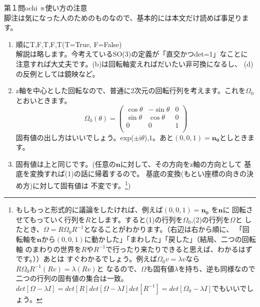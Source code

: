 \begin{answer}{第１問}{ochi}
※使い方の注意\\
脚注は気になった人のためのものなので、基本的には本文だけ読めば事足ります。
\begin{enumerate}
\item
  順にT,F,T,F,T(T=True, F=False)\\

  解説は略します。今考えているSO(3)の定義が「直交かつdet=1」なことに
  注意すれば大丈夫です。(b)は回転軸変えればだいたい非可換になるし、
  (d)の反例としては鏡映など。\\

\item
  z軸を中心とした回転なので、普通に2次元の回転行列を考えます。これを$\Omega_0$とおいときます。
  \begin{equation}
  \Omega_0(\theta)=
  \begin{pmatrix}
  \cos \theta & -\sin \theta & 0\\
  \sin \theta & \cos \theta & 0\\
  0 & 0 & 1\\
  \end{pmatrix}
  \end{equation}
  固有値の出し方はいいでしょう。exp($\pm$i$\theta$),$1$。あと$(0,0,1)=\mathbf{n_0}$としときます。\\

\item
  固有値は上と同じです。(任意の$\mathbf{n}$に対して、その方向をz軸の方向として
  基底を変換すれば(1)の話に帰着するので。
  基底の変換(もとい座標の向きの決め方)に対して固有値は
  不変です。\footnote{もしもっと形式的に議論をしたければ、例えば$(0,0,1)=\mathbf{n_0}$
  を$\mathbf{n}$に
  回転させてもっていく行列を$R$とします。すると(1)の行列を$\Omega_0$,(2)の行列を$\Omega$と
  したとき、$\Omega=R\Omega_0 R^{-1}$となることがわかります。（右辺は右から順に、
  「回転軸を$\mathbf{n}$から$(0,0,1)$に動かした」「まわした」「戻した」（結局、二つの回転軸
  のまわりの世界を$R$や$R^{-1}$で行ったり来たりできると思えば、わかるはずです。））あとは
  すぐわかるでしょう。例えば$\Omega_0 v=\lambda v$なら$R\Omega_0 R^{-1} (R v)=\lambda (R v)$と
  なるので、$\Omega$も固有値$\lambda$を持ち、逆も同様なので二つの行列の固有値の集合は一致。
  $det[ \Omega-\lambda I]=det[R]det[\Omega-\lambda I]det[R^{-1}]=
  det[ \Omega_0 - \lambda I]$でもいいでしょう。})


\end{enumerate}
\end{answer}
